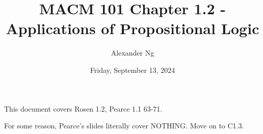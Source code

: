 \documentclass[12pt]{article}
\begin{document}
\title{MACM 101 Chapter 1.2 - Applications of Propositional Logic}
\author{Alexander Ng}
\date{Friday, September 13, 2024}

\maketitle

This document covers Rosen 1.2, Pearce 1.1 63-71.

For some reason, Pearce's slides literally cover NOTHING. Move on to C1.3.
\end{document}
